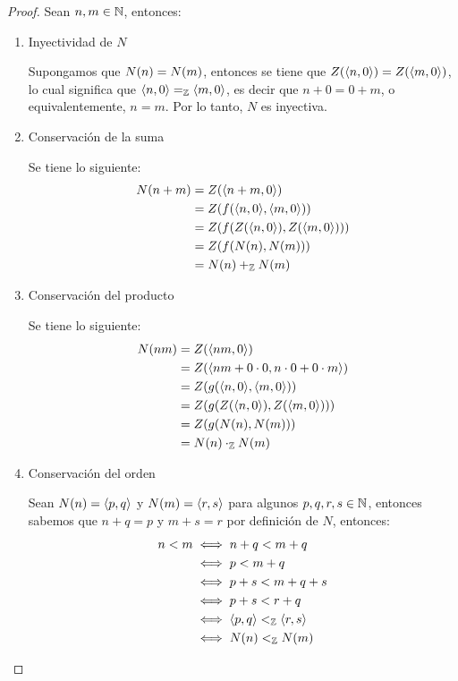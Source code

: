 \begin{proof}
	Sean $n, m\in\NN$, entonces:

	\begin{enumerate}
		\item Inyectividad de $N$

		Supongamos que $N\pa*{n} = N\pa*{m}$, entonces se tiene que $Z\pa*{\inner*{n, 0}} = Z\pa*{\inner*{m, 0}}$, lo cual significa que $\inner*{n, 0} =_{\ZZ}\inner*{m, 0}$, es decir que $n + 0 = 0 + m$, o equivalentemente, $n = m$. Por lo tanto, $N$ es inyectiva.

		\item Conservación de la suma

		Se tiene lo siguiente:
		\begin{align*}
			N\pa*{n + m} &= Z\pa*{\inner*{n + m, 0}}\\
			&= Z\pa*{f\pa*{\inner*{n, 0},\inner*{m, 0}}}\\
			&= Z\pa*{f\pa*{Z\pa*{\inner*{n, 0}}, Z\pa*{\inner*{m, 0}}}}\\
			&= Z\pa*{f\pa*{N\pa*{n}, N\pa*{m}}}\\
			&= N\pa*{n} +_{\ZZ} N\pa*{m}
		\end{align*}

		\item Conservación del producto

		Se tiene lo siguiente:
		\begin{align*}
			N\pa*{nm} &= Z\pa*{\inner*{nm, 0}}\\
			&= Z\pa*{\inner*{nm + 0\cdot 0, n\cdot 0 + 0\cdot m}}\\
			&= Z\pa*{g\pa*{\inner*{n, 0},\inner*{m, 0}}}\\
			&= Z\pa*{g\pa*{Z\pa*{\inner*{n, 0}}, Z\pa*{\inner*{m, 0}}}}\\
			&= Z\pa*{g\pa*{N\pa*{n}, N\pa*{m}}}\\
			&= N\pa*{n}\cdot_{\ZZ} N\pa*{m}
		\end{align*}

		\item Conservación del orden

		Sean $N\pa*{n} =\inner*{p, q}$ y $N\pa*{m} =\inner*{r, s}$ para algunos $p, q, r, s\in\NN$, entonces sabemos que $n + q = p$ y $m + s = r$ por definición de $N$, entonces:
		\begin{align*}
			n < m &\iff n + q < m + q\\
			&\iff p < m + q\\
			&\iff p + s < m + q + s\\
			&\iff p + s < r + q\\
			&\iff\inner*{p, q} <_{\ZZ}\inner*{r, s}\\
			&\iff N\pa*{n} <_{\ZZ} N\pa*{m}
		\end{align*}
	\end{enumerate}
\end{proof}

